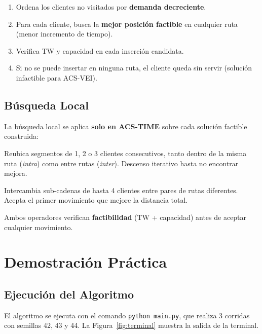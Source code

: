 \documentclass[12pt, letterpaper]{article}
\begin{document}
\begin{enumerate}[leftmargin=2cm]
  \item Ordena los clientes no visitados por \textbf{demanda decreciente}.
  \item Para cada cliente, busca la \textbf{mejor posición factible} en cualquier ruta (menor incremento de tiempo).
  \item Verifica TW y capacidad en cada inserción candidata.
  \item Si no se puede insertar en ninguna ruta, el cliente queda sin servir (solución infactible para ACS-VEI).
\end{enumerate}

\subsection{Búsqueda Local}

La búsqueda local se aplica \textbf{solo en ACS-TIME} sobre cada solución factible construida:

\begin{description}[style=nextline, leftmargin=2cm]
  \item[\textbf{Or-opt}] Reubica segmentos de 1, 2 o 3 clientes consecutivos, tanto dentro de la misma ruta (\textit{intra}) como entre rutas (\textit{inter}). Descenso iterativo hasta no encontrar mejora.
  \item[\textbf{CROSS Exchange}] Intercambia sub-cadenas de hasta 4 clientes entre pares de rutas diferentes. Acepta el primer movimiento que mejore la distancia total.
\end{description}

Ambos operadores verifican \textbf{factibilidad} (TW + capacidad) antes de aceptar cualquier movimiento.

\newpage
\section{Demostración Práctica}
\label{sec:demo}

\subsection{Ejecución del Algoritmo}

El algoritmo se ejecuta con el comando \texttt{python main.py}, que realiza 3 corridas con semillas 42, 43 y 44. La Figura~\ref{fig:terminal} muestra la salida de la terminal.
\end{document}
